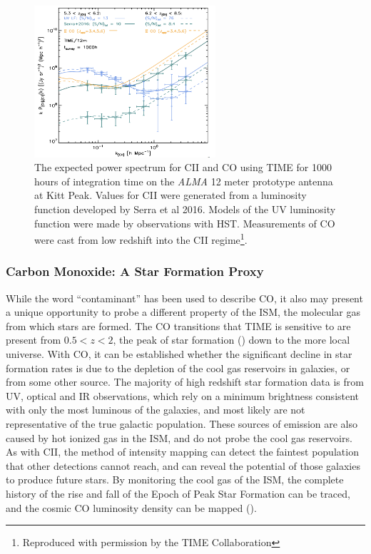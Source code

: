 \documentclass[manuscript]{aastex}
\begin{document}
\begin{figure}[H]
\centering
\captionsetup{width=0.6\textwidth}
\includegraphics[width=0.6\textwidth]{bock1.png}
\caption[The expected power spectrum for CII and CO using TIME. -(TIME Collaboration)]{The expected power spectrum for CII and CO using TIME for 1000 hours of integration time on the \textit{ALMA} 12 meter prototype antenna at Kitt Peak. Values for CII were generated from a luminosity function developed by Serra et al 2016. Models of the UV luminosity function were made by observations with HST. Measurements of CO were cast from low redshift into the CII regime\footnote{Reproduced with permission by the TIME Collaboration}.}
\vspace{-0.8cm}
\label{fig:coc2power}
\end{figure}

\subsubsection{\textbf{Carbon Monoxide: A Star Formation Proxy}}

While the word ``contaminant'' has been used to describe CO, it also may present a unique opportunity to probe a different property of the ISM, the molecular gas from which stars are formed. The CO transitions that TIME is sensitive to are present from $0.5 < z < 2$, the peak of star formation (\cite{Madau2014}) down to the more local universe.  With CO, it can be established whether the significant decline in star formation rates is due to the depletion of the cool gas reservoirs in galaxies, or from some other source. The majority of high redshift star formation data is from UV, optical and IR observations, which rely on a minimum brightness consistent with only the most luminous of the galaxies, and most likely are not representative of the true galactic population. These sources of emission are also caused by hot ionized gas in the ISM, and do not probe the cool gas reservoirs. As with CII, the method of intensity mapping can detect the faintest population that other detections cannot reach, and can reveal the potential of those galaxies to produce future stars. By monitoring the cool gas of the ISM, the complete history of the rise and fall of the Epoch of Peak Star Formation can be traced, and the cosmic CO luminosity density can be mapped (\cite{Kovetz2017}). 
\end{document}
